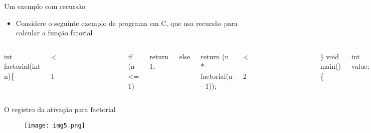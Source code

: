\documentclass[10pt]{beamer}
\begin{document}
\begin{frame}{Um exemplo com recursão}
 \begin{itemize}
    	\item Considere o seguinte exemplo de programa em C, que usa recursão para calcular a função fatorial
    \end{itemize}
    
    \begin{columns}[T,onlytextwidth]
  
    int factorial(int n)\{
    
    \hspace{1cm} <----------------------------- 1
    
    \hspace{1cm} if (n <= 1)
    
    \hspace{1cm}\hspace{1cm} return 1;
    
    \hspace{1cm} else
    
    \hspace{1cm}\hspace{1cm} return (n * factorial(n  - 1));
    
    \hspace{1cm}<----------------------------- 2
    
    \}
    void main() \{
    
    \hspace{1cm} int value;
    
    \hspace{1cm} value = factorial(3);
    
    \hspace{1cm}<----------------------------- 3
    
    \}
    
    \end{columns}
    
\end{frame}
\begin{frame}{O registro da ativação para factorial}
  
  \begin{figure}
      \texttt{[image: img5.png]}
    \end{figure}
  
\end{frame}
\end{document}
